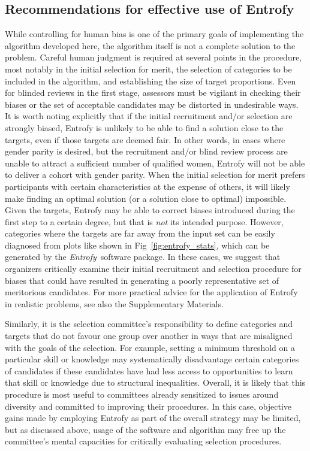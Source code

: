 \documentclass[10pt,letterpaper]{article}
\newcommand{\project}[1]{\textsl{#1}}
\newcommand{\entrofy}{\project{Entrofy}}
\begin{document}
\subsection*{Recommendations for effective use of Entrofy}
While controlling for human bias is one of the primary goals of implementing the algorithm developed here, the algorithm itself is not a complete solution to the problem.
Careful human judgment is required at several points in the procedure, most notably in the initial selection for merit, the selection of categories to be included in the algorithm, and establishing the size of target proportions.
Even for blinded reviews in the first stage, assessors must be vigilant in checking their biases or the set of acceptable candidates may be distorted in undesirable ways.
It is worth noting explicitly that if the initial recruitment and/or selection are strongly biased, Entrofy is unlikely to be able to find a solution close to the targets, even if those targets are deemed fair. 
In other words, in cases where gender parity is desired, but the recruitment and/or blind review process are unable to attract a sufficient number of qualified women, Entrofy will not be able to deliver a cohort with gender parity.
When the initial selection for merit prefers participants with certain characteristics at the expense of others, it will likely make finding an optimal solution (or a solution close to optimal) impossible.
Given the targets, Entrofy may be able to correct biases introduced during the first step to a certain degree, but that is \textit{not} its intended purpose.
However, categories where the targets are far away from the input set can be easily diagnosed from plots like shown in Fig~\ref{fig:entrofy_stats}, which can be generated by the \entrofy\ software package.
In these cases, we suggest that organizers critically examine their initial recruitment and selection procedure for biases that could have resulted in generating a poorly representative set of meritorious candidates. For more practical advice for the application of Entrofy in realistic problems, see also the Supplementary Materials.


Similarly, it is the selection committee's responsibility to define categories and targets that do not favour one group over another in ways that are misaligned with the goals of the selection. For example, setting a minimum threshold on a particular skill or knowledge may systematically disadvantage certain categories of candidates if these candidates have had less access to opportunities to learn that skill or knowledge due to structural inequalities. 
Overall, it is likely that this procedure is most useful to committees already sensitized to issues around diversity and committed to improving their procedures.
In this case, objective gains made by employing Entrofy as part of the overall strategy may be limited, but as discussed above, usage of the software and algorithm may free up the committee's mental capacities for critically evaluating selection procedures.
\end{document}
